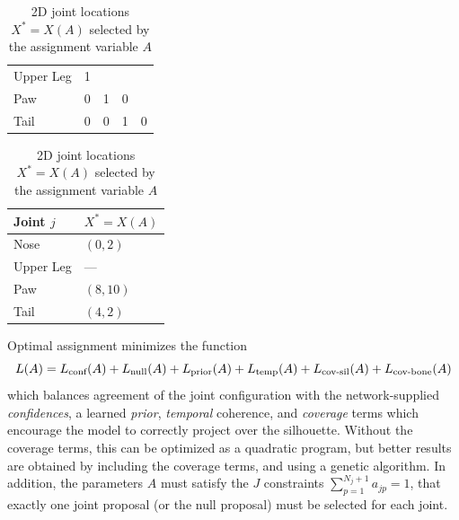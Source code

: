 \begin{table}
{{\begin{tabular}{@{}lllll@{}}
            Upper Leg & 1 & \cellcolor[HTML]{808080} & \cellcolor[HTML]{808080} & \cellcolor[HTML]{808080} \\
            Paw       & 0 & 1                        & 0                        & \cellcolor[HTML]{808080} \\
            Tail      & 0 & 0                        & 1                        & 0                        \\
            \bottomrule
            \end{tabular}
            \caption{Assignment variables $A = \bvec a_j = \{a_{jp}\} \in \{0, 1\}^{N_j+1}$ for the current frame stored as a jagged array.}
            \label{tab:oja-proposals}
        }
        \bigskip
        \parbox{\linewidth}{
            \strut
            \centering
            \begin{tabular}{@{}ll@{}}
                \toprule
                Joint $j$ & $X^* = X(A)$ \\
                \midrule
                Nose      & $(0, 2)$     \\
                Upper Leg & ---          \\
                Paw       & $(8, 10)$    \\
                Tail      & $(4, 2)$     \\
                \bottomrule
            \end{tabular}
            \caption{2D joint locations $X^* = X(A)$ selected by the assignment variable $A$}
            \label{tab:oja-selected}
        }
    }
\end{table}        
        

Optimal assignment minimizes the function
\begin{equation}
L(A) = L_{\textrm{conf}}(A) + L_{\textrm{null}}(A) + L_{\textrm{prior}}(A) + L_{\textrm{temp}}(A) + L_{\textrm{cov-sil}}(A) + L_{\textrm{cov-bone}}(A)
\end{equation}
which balances agreement of the joint configuration with the network-supplied {\em confidences}, a learned {\em prior}, {\em temporal} coherence, and {\em coverage} terms which encourage the model to correctly project over the silhouette. Without the coverage terms, this can be optimized as a quadratic program, but better results are obtained by including the coverage terms, and using a genetic algorithm. In addition, the parameters $A$ must satisfy the $J$ constraints $\sum_{p=1}^{N_j+1} a_{jp} = 1$, that exactly one joint proposal (or the null proposal) must be selected for each joint.

